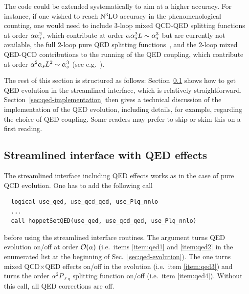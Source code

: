 %
The code could be extended systematically to aim at a higher
accuracy. For instance, if one wished to reach N$^3$LO accuracy in the
phenomenological counting, one would need to include 3-loop mixed
QCD-QED splitting functions at order $\alpha \alpha_s^2$, which contribute
at order $\alpha \alpha_s^2 L \sim \alpha_s^3$ but are currently not
available, the full 2-loop pure QED splitting functions~\cite{deFlorian:2016gvk}, 
%
and the 2-loop mixed QED-QCD contributions to the running
of the QED coupling, which contribute at order $\alpha^2 \alpha_s L^2 \sim \alpha_s^3$
(see e.g.\ \cite{Cieri:2018sfk}). 
% 
%

The rest of this section is structured as follows:
%
Section~\ref{sec:qed-streamlined} shows how to get QED evolution in
the streamlined interface, which is relatively straightforward.
%
Section~\ref{sec:qed-implementation} then gives a technical discussion
of the implementation of the QED evolution, including details, for
example, regarding the choice of QED coupling.
%
Some readers may prefer to skip or skim this on a first reading.

\subsection{Streamlined interface with QED effects} 
\label{sec:qed-streamlined}
The streamlined interface including QED effects works as in the case of pure QCD evolution.
One has to add the following call
\begin{lstlisting}
  logical use_qed, use_qcd_qed, use_Plq_nnlo
  ...
  call hoppetSetQED(use_qed, use_qcd_qed, use_Plq_nnlo)
\end{lstlisting}
before using the streamlined interface routines.
%
The  argument turns QED evolution on/off at order
${\cal O}(\alpha)$ (i.e.\ items \ref{item:qed1} and \ref{item:qed2} in
the enumerated list at the beginning of
Sec.~\ref{sec:qed-evolution}).
%
The  one turns
mixed QCD$\times$QED effects on/off in the evolution (i.e.\ item \ref{item:qed3}) and  turns 
the order $\alpha^2 P_{\ell q}$ splitting function on/off (i.e.\
item \ref{item:qed4}).
%
Without this call, all QED corrections
are off.

